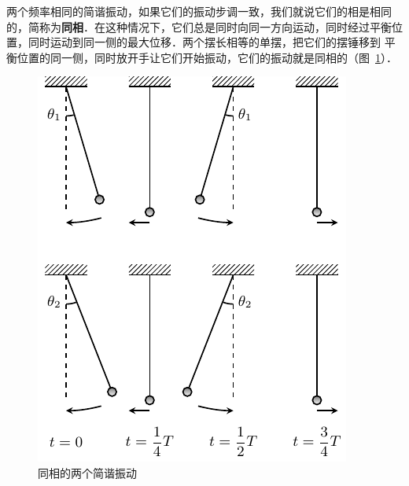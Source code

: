 两个频率相同的简谐振动，如果它们的振动步调一致，我们就说它们的相是相同的，简称为\textbf{同相}．在这种情况下，它们总是同时向同一方向运动，同时经过平衡位置，同时运动到同一侧的最大位移．两个摆长相等的单摆，把它们的摆锤移到
平衡位置的同一侧，同时放开手让它们开始振动，它们的振动就是同相的（图~\ref{fig_A_9-4}）．
\begin{figure}[htbp]
    \centering
    \includegraphics{fig/A/9-4.pdf}
    \caption{同相的两个简谐振动}\label{fig_A_9-4}
\end{figure}


